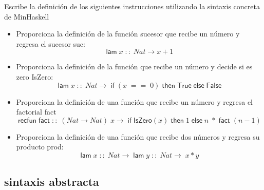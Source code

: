     \begin{exercise}
    Escribe la definición de los siguientes instrucciones utilizando la sintaxis concreta de \textsf{MinHaskell}\\

	\begin{itemize}
		\item Proporciona la definición de la función sucesor que recibe un número y regresa el sucesor \textsf{suc}: 
			$$ \textsf{lam}\; x\;::\; \textit{Nat} \rightarrow x + 1$$
		\item Proporciona la definición de la función que recibe un número y decide si es zero \textsf{IsZero}:
			 $$ \textsf{lam}\; x\;::\; \textit{Nat} \rightarrow\; \textsf{if}\; (x\; ==\; 0) \; \textsf{then}\; \textsf{True}\; \textsf{else}\; \textsf{False}$$
		\item Proporciona la definición de una función que recibe un número y regresa el factorial \textsf{fact}
			 $$ \textsf{recfun}\; \textsf{fact}\; ::\; (\textit{Nat} \rightarrow \textit{Nat})\; x \rightarrow\; \textsf{if}\; \textsf{IsZero}(x)\; \textsf{then}\; 1\; \textsf{else}\; n\; *\; \textsf{fact}\; (n-1)$$
		\item Proporciona la definición de una función que recibe dos números y regresa su producto \textsf{prod}:
			$$ \textsf{lam}\; x\; ::\; Nat \rightarrow\; \textsf{lam}\; y\; ::\; Nat \rightarrow\; x*y$$
	\end{itemize}

    \end{exercise}

\subsection{sintaxis abstracta}

